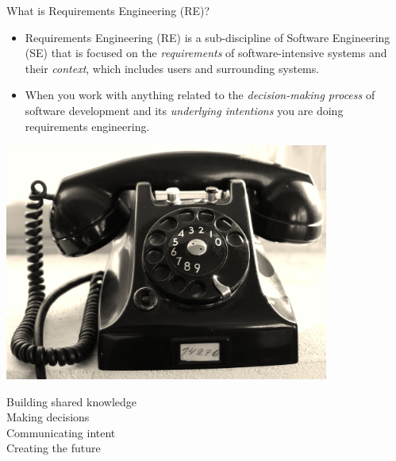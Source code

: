 \begin{Slide}{What is Requirements Engineering (RE)?}
\begin{itemize}
\item  Requirements Engineering (RE) is a sub-discipline of Software Engineering (SE) that is focused on the \textit{requirements} of software-intensive systems and their \textit{context}, which includes users and surrounding systems.
\item When you work with anything related to the \textit{decision-making process} of software development and its \emph{underlying intentions} you are doing requirements engineering.
\end{itemize}%
\begin{minipage}[t]{0.4\textwidth}
\vspace{0pt}\hfill\includegraphics[width=0.8\textwidth]{img/phone}
\end{minipage}%
\hspace{2em}\begin{minipage}[t]{0.5\textwidth}
\vspace{1em} 
Building shared knowledge \\ Making decisions \\ Communicating intent \\ Creating the future
\end{minipage}%
\end{Slide}